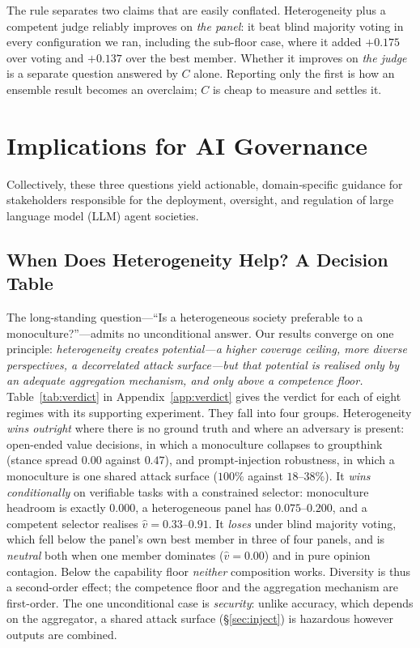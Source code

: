 \documentclass[manuscript,screen,review]{acmart}
\begin{document}
The rule separates two claims that are easily conflated. Heterogeneity plus a
competent judge reliably improves on \emph{the panel}: it beat blind majority
voting in every configuration we ran, including the sub-floor case, where it added
$+0.175$ over voting and $+0.137$ over the best member. Whether it improves on
\emph{the judge} is a separate question answered by $C$ alone. Reporting only the
first is how an ensemble result becomes an overclaim; $C$ is cheap to measure and
settles it.

\section{Implications for AI Governance}
Collectively, these three questions yield actionable, domain‑specific guidance for stakeholders responsible for the deployment, oversight, and regulation of large language model (LLM) agent societies.

\subsection{When Does Heterogeneity Help? A Decision Table}
\label{sec:verdict}
The long-standing question—“Is a heterogeneous society preferable to a
monoculture?”—admits no unconditional answer. Our results converge on one
principle: \emph{heterogeneity creates potential---a higher coverage ceiling, more
diverse perspectives, a decorrelated attack surface---but that potential is
realised only by an adequate aggregation mechanism, and only above a competence
floor.} Table~\ref{tab:verdict} in Appendix~\ref{app:verdict} gives the verdict for
each of eight regimes with its supporting experiment. They fall into four groups.
Heterogeneity \emph{wins outright} where there is no ground truth and where an
adversary is present: open-ended value decisions, in which a monoculture collapses
to groupthink (stance spread $0.00$ against $0.47$), and prompt-injection
robustness, in which a monoculture is one shared attack surface ($100\%$ against
$18$--$38\%$). It \emph{wins conditionally} on verifiable tasks with a constrained
selector: monoculture headroom is exactly $0.000$, a heterogeneous panel has
$0.075$--$0.200$, and a competent selector realises $\hat v=0.33$--$0.91$. It
\emph{loses} under blind majority voting, which fell below the panel's own best
member in three of four panels, and is \emph{neutral} both when one member
dominates ($\hat v=0.00$) and in pure opinion contagion. Below the capability floor
\emph{neither} composition works. Diversity is thus a second-order effect; the
competence floor and the aggregation mechanism are first-order. The one
unconditional case is \emph{security}: unlike accuracy, which depends on the
aggregator, a shared attack surface (\S\ref{sec:inject}) is hazardous however
outputs are combined.
\end{document}
